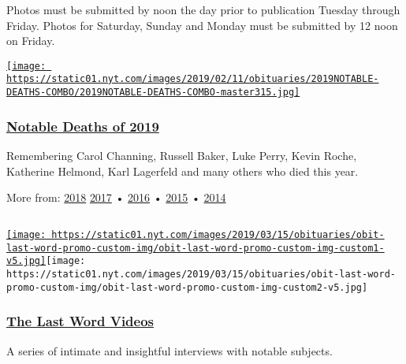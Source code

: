 Photos must be submitted by noon the day prior to publication Tuesday
through Friday. Photos for Saturday, Sunday and Monday must be submitted
by 12 noon on Friday.

\href{https://www.nytimes.com/interactive/2019/obituaries/notable-deaths.html}{\texttt{[image: https://static01.nyt.com/images/2019/02/11/obituaries/2019NOTABLE-DEATHS-COMBO/2019NOTABLE-DEATHS-COMBO-master315.jpg]}}

\hypertarget{notable-deaths-of-2019}{%
\subsubsection{\texorpdfstring{\href{https://www.nytimes.com/interactive/2019/obituaries/notable-deaths.html}{Notable
Deaths of 2019}}{Notable Deaths of 2019}}\label{notable-deaths-of-2019}}

Remembering Carol Channing, Russell Baker, Luke Perry, Kevin Roche,
Katherine Helmond, Karl Lagerfeld and many others who died this year.

More from:
\href{https://www.nytimes.com/interactive/2018/obituaries/notable-deaths.html}{2018}
\href{https://www.nytimes.com/interactive/projects/notable-deaths/2017}{2017}
•
\href{https://www.nytimes.com/interactive/projects/notable-deaths/2016}{2016}
•
\href{https://www.nytimes.com/interactive/2015/obituaries/notable-deaths-2015.html}{2015}
•
\href{https://www.nytimes.com/interactive/2014/obituaries/notable-deaths-2014.html}{2014}

\subsection{}

\href{https://www.nytimes.com/video/last-word}{\texttt{[image: https://static01.nyt.com/images/2019/03/15/obituaries/obit-last-word-promo-custom-img/obit-last-word-promo-custom-img-custom1-v5.jpg]}}\texttt{[image: https://static01.nyt.com/images/2019/03/15/obituaries/obit-last-word-promo-custom-img/obit-last-word-promo-custom-img-custom2-v5.jpg]}

\hypertarget{the-last-word-videos}{%
\subsubsection{\texorpdfstring{\href{https://www.nytimes.com/video/last-word}{The
Last Word Videos}}{The Last Word Videos}}\label{the-last-word-videos}}

A series of intimate and insightful interviews with notable subjects.

